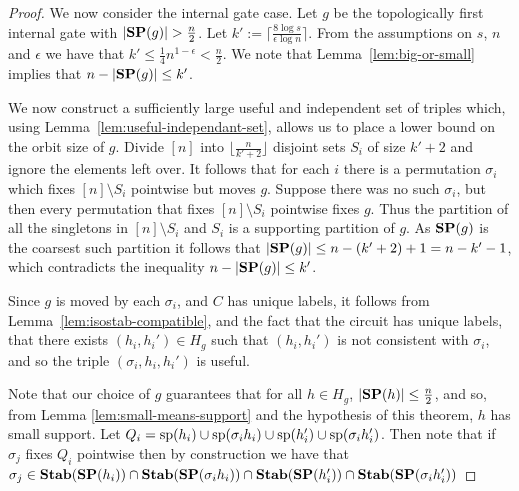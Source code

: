\documentclass[../paper.tex]{subfiles}
\begin{document}
\begin{proof}
  We now consider the internal gate case. Let $g$ be the topologically first
  internal gate with $\vert \text{\textbf{SP}}(g) \vert > \frac{n}{2}$. Let $k' := \lceil
  \frac{8 \log s}{\epsilon \log n} \rceil$. From the assumptions on $s$, $ n$
  and $\epsilon$ we have that $k' \leq \frac{1}{4}n^{1-\epsilon} < \frac{n}{2}$.
  We note that Lemma~\ref{lem:big-or-small} implies that $n - \vert \text{\textbf{SP}}(g) \vert
  \leq k'$.
  
  We now construct a sufficiently large useful and independent set of triples
  which, using Lemma~\ref{lem:useful-independant-set}, allows us to place a
  lower bound on the orbit size of $g$. Divide $[n]$ into $\lfloor \frac{n}{k' +
    2} \rfloor$ disjoint sets $S_i$ of size $k' + 2$ and ignore the elements
  left over. It follows that for each $i$ there is a permutation $\sigma_i$
  which fixes $[n] \setminus S_i$ pointwise but moves $g$. Suppose there was no
  such $\sigma_i$, but then every permutation that fixes $[n]\setminus S_i$
  pointwise fixes $g$. Thus the partition of all the singletons in $[n]\setminus
  S_i$ and $S_i$ is a supporting partition of $g$. As $\text{\textbf{SP}}(g)$ is the coarsest
  such partition it follows that $\vert \text{\textbf{SP}}(g) \vert \leq n - (k'+2) + 1 = n -
  k' - 1$, which contradicts the inequality $n - \vert \text{\textbf{SP}}(g) \vert \leq k'$.

  Since $g$ is moved by each $\sigma_i$, and $C$ has unique labels, it follows
  from Lemma~\ref{lem:isostab-compatible}, and the fact that the circuit has
  unique labels, that there exists $(h_i, h_i') \in H_g$ such that $(h_i, h_i')$
  is not consistent with $\sigma_i$, and so the triple $(\sigma_i, h_i, h_i')$
  is useful.

  Note that our choice of $g$ guarantees that for all $h \in H_g$, $\vert \text{\textbf{SP}}(h)
  \vert \leq \frac{n}{2}$, and so, from Lemma \ref{lem:small-means-support} and
  the hypothesis of this theorem, $h$ has small support. Let $Q_i = \text{sp}(h_i)
  \cup \text{sp}(\sigma_i h_i) \cup \text{sp}(h_i') \cup \text{sp}(\sigma_i h_i')$. Then
  note that if $\sigma_j$ fixes $Q_i$ pointwise then by construction we have
  that $\sigma_j \in \text{\textbf{Stab}}(\text{\textbf{SP}}(h_i)) \cap \text{\textbf{Stab}}(\text{\textbf{SP}}(\sigma_i h_i)) \cap
  \text{\textbf{Stab}}(\text{\textbf{SP}}(h_i')) \cap \text{\textbf{Stab}}(\text{\textbf{SP}}(\sigma_i h_i'))$


\end{proof}
\end{document}
